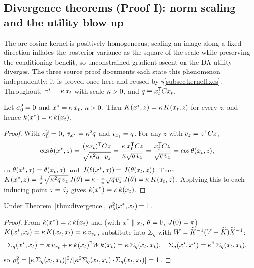 \subsection{Divergence theorems (Proof I): norm scaling and the utility blow-up}
\label{subsec:divergence}

The arc-cosine kernel is positively homogeneous; scaling an image along a fixed
direction inflates the posterior variance as the square of the scale while
preserving the conditioning benefit, so unconstrained gradient ascent on the DA
utility diverges. The three source proof documents each state this phenomenon
independently; it is proved once here and reused by \S\ref{subsec:kernelfixes}.
Throughout, $x^*=\kappa\,x_t$ with scale $\kappa>0$, and $q\equiv x_t^{\mathsf{T}}C x_t$.

\begin{theorem}[Cross-kernel proportionality, $\sigz^2=0$]\label{thm:divergence}
Let $\sigz^2=0$ and $x^*=\kappa\,x_t$, $\kappa>0$. Then $K(x^*,z)=\kappa\,K(x_t,z)$
for every $z$, and hence $k(x^*)=\kappa\,k(x_t)$.
\end{theorem}
\begin{proof}
With $\sigz^2=0$, $v_{x^*}=\kappa^2 q$ and $v_{x_t}=q$. For any $z$ with
$v_z=z^{\mathsf{T}}C z$,
\[
  \cos\theta(x^*,z)=\frac{(\kappa x_t)^{\mathsf{T}}C z}{\sqrt{\kappa^2 q\cdot v_z}}
   =\frac{\kappa\,x_t^{\mathsf{T}}C z}{\kappa\sqrt{q\,v_z}}
   =\frac{x_t^{\mathsf{T}}C z}{\sqrt{q\,v_z}}=\cos\theta(x_t,z),
\]
so $\theta(x^*,z)=\theta(x_t,z)$ and $J(\theta(x^*,z))=J(\theta(x_t,z))$. Then
$K(x^*,z)=\tfrac1\pi\sqrt{\kappa^2 q\,v_z}\,J(\theta)=\kappa\cdot\tfrac1\pi\sqrt{q\,v_z}\,J(\theta)=\kappa\,K(x_t,z)$.
Applying this to each inducing point $z=\widetilde{z}_j$ gives $k(x^*)=\kappa\,k(x_t)$.
\end{proof}

\begin{corollary}\label{cor:rho1}
Under Theorem~\ref{thm:divergence}, $\rho_{\lambda}^2(x^*,x_t)=1$.
\end{corollary}
\begin{proof}
From $k(x^*)=\kappa\,k(x_t)$ and (with $x^*\parallel x_t$, $\theta=0$,
$J(0)=\pi$) $K(x^*,x_t)=\kappa\,K(x_t,x_t)=\kappa\,v_{x_t}$, substitute
into $\Sigma_q$ with $W=\widetilde{K}^{-1}(V-\widetilde{K})\widetilde{K}^{-1}$:
\[
  \Sigma_q(x^*,x_t)=\kappa\,v_{x_t}+\kappa\,k(x_t)^{\mathsf{T}} Wk(x_t)=\kappa\,\Sigma_q(x_t,x_t),
  \quad
  \Sigma_q(x^*,x^*)=\kappa^2\,\Sigma_q(x_t,x_t),
\]
so $\rho_{\lambda}^2=[\kappa\,\Sigma_q(x_t,x_t)]^2/[\kappa^2\Sigma_q(x_t,x_t)\cdot\Sigma_q(x_t,x_t)]=1$.
\end{proof}

